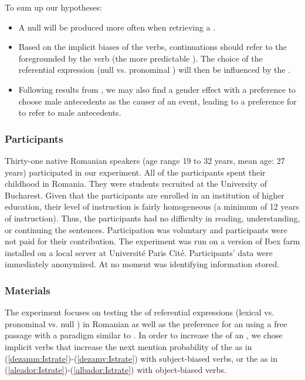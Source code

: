 \documentclass[output=paper,colorlinks,citecolor=brown]{langscibook}
\begin{document}
To sum up our hypotheses:
\begin{itemize}
\item A null  will be produced more often when retrieving a  .
\item Based on the implicit  biases of the verbs, continuations should refer to the  foregrounded by the verb (the more predictable ). The choice of the referential expression (null vs. pronominal ) will then be influenced by the .
\item Following results from \citet{ferstl2011implicit}, we may also find a gender effect with a preference to choose male antecedents as the causer of an event, leading to a preference for  to refer to male antecedents.
\end{itemize}

\subsubsection{Participants}
Thirty-one native Romanian speakers (age range 19 to 32 years, mean age: 27 years) participated in our experiment. All of the participants spent their childhood in Romania. They were students recruited at the University of Bucharest. Given that the participants are enrolled in an institution of higher education, their level of instruction is fairly homogeneous (a minimum of 12 years of instruction). Thus, the participants had no difficulty in reading, understanding, or continuing the sentences. Participation was voluntary and participants were not paid for their contribution. The experiment was run on a version of Ibex farm installed on a local server at Université Paris Cité. Participants’ data were immediately anonymized. At no moment was identifying information stored.

\subsubsection{Materials}
The experiment focuses on testing the  of referential expressions (lexical vs. pronominal vs. null ) in Romanian as well as the preference for an  using a free passage  with a paradigm similar to \citet{kehler2019prominence}. 
In order to increase the  of an , we chose implicit  verbs  that increase the next mention probability of the  as in (\ref{dezamm:Istrate})-(\ref{dezamv:Istrate}) with subject-biased verbs, or the  as in (\ref{aleador:Istrate})-(\ref{albador:Istrate}) with object-biased verbs.
\end{document}
